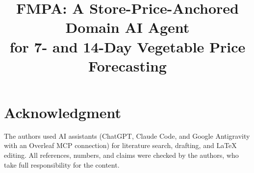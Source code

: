 \documentclass[conference]{IEEEtran}
\begin{document}
\title{FMPA: A Store-Price-Anchored Domain AI Agent\\
for 7- and 14-Day Vegetable Price Forecasting}

\author{
}

\maketitle








\section*{Acknowledgment}
The authors used AI assistants (ChatGPT, Claude Code, and Google Antigravity
with an Overleaf MCP connection) for literature search, drafting, and \LaTeX{}
editing. All references, numbers, and claims were checked by the authors, who
take full responsibility for the content.



\end{document}
